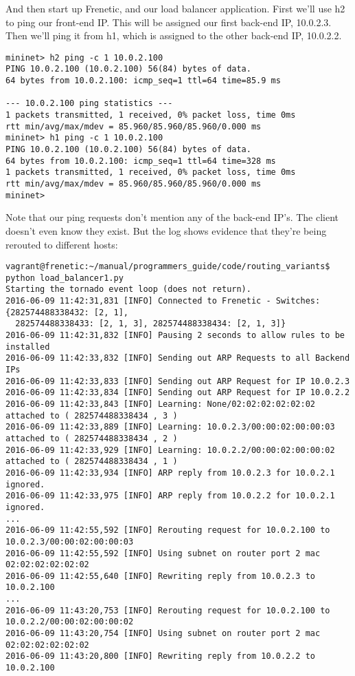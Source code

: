 And then start up Frenetic, and our load balancer application.  
First we'll use h2 to ping our front-end IP.
This will be assigned our first back-end IP, 10.0.2.3.  Then we'll ping it from h1, which is
assigned to the other back-end IP, 10.0.2.2.

\begin{verbatim}
mininet> h2 ping -c 1 10.0.2.100
PING 10.0.2.100 (10.0.2.100) 56(84) bytes of data.
64 bytes from 10.0.2.100: icmp_seq=1 ttl=64 time=85.9 ms

--- 10.0.2.100 ping statistics ---
1 packets transmitted, 1 received, 0% packet loss, time 0ms
rtt min/avg/max/mdev = 85.960/85.960/85.960/0.000 ms
mininet> h1 ping -c 1 10.0.2.100
PING 10.0.2.100 (10.0.2.100) 56(84) bytes of data.
64 bytes from 10.0.2.100: icmp_seq=1 ttl=64 time=328 ms
1 packets transmitted, 1 received, 0% packet loss, time 0ms
rtt min/avg/max/mdev = 85.960/85.960/85.960/0.000 ms
mininet>
\end{verbatim}

Note that our ping requests don't mention any of the back-end IP's.  The client doesn't 
even know they exist.  But the log shows evidence that they're being rerouted to different
hosts:

\begin{verbatim}
vagrant@frenetic:~/manual/programmers_guide/code/routing_variants$ python load_balancer1.py
Starting the tornado event loop (does not return).
2016-06-09 11:42:31,831 [INFO] Connected to Frenetic - Switches: {282574488338432: [2, 1], 
  282574488338433: [2, 1, 3], 282574488338434: [2, 1, 3]}
2016-06-09 11:42:31,832 [INFO] Pausing 2 seconds to allow rules to be installed
2016-06-09 11:42:33,832 [INFO] Sending out ARP Requests to all Backend IPs
2016-06-09 11:42:33,833 [INFO] Sending out ARP Request for IP 10.0.2.3
2016-06-09 11:42:33,834 [INFO] Sending out ARP Request for IP 10.0.2.2
2016-06-09 11:42:33,843 [INFO] Learning: None/02:02:02:02:02:02 attached to ( 282574488338434 , 3 )
2016-06-09 11:42:33,889 [INFO] Learning: 10.0.2.3/00:00:02:00:00:03 attached to ( 282574488338434 , 2 )
2016-06-09 11:42:33,929 [INFO] Learning: 10.0.2.2/00:00:02:00:00:02 attached to ( 282574488338434 , 1 )
2016-06-09 11:42:33,934 [INFO] ARP reply from 10.0.2.3 for 10.0.2.1 ignored.
2016-06-09 11:42:33,975 [INFO] ARP reply from 10.0.2.2 for 10.0.2.1 ignored.
...
2016-06-09 11:42:55,592 [INFO] Rerouting request for 10.0.2.100 to 10.0.2.3/00:00:02:00:00:03
2016-06-09 11:42:55,592 [INFO] Using subnet on router port 2 mac 02:02:02:02:02:02
2016-06-09 11:42:55,640 [INFO] Rewriting reply from 10.0.2.3 to 10.0.2.100
...
2016-06-09 11:43:20,753 [INFO] Rerouting request for 10.0.2.100 to 10.0.2.2/00:00:02:00:00:02
2016-06-09 11:43:20,754 [INFO] Using subnet on router port 2 mac 02:02:02:02:02:02
2016-06-09 11:43:20,800 [INFO] Rewriting reply from 10.0.2.2 to 10.0.2.100
\end{verbatim}

